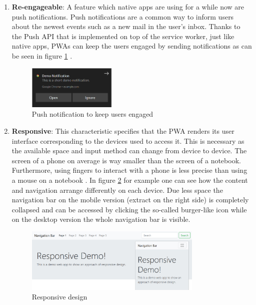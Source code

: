 \begin{enumerate}
	\item \textbf{Re-engageable}: A feature which native apps are using for a while now are push notifications. Push notifications are a common way to inform users about the newest events such as a new mail in the user’s inbox. Thanks to the Push API that is implemented on top of the service worker, just like native apps,  \acs{PWA}s can keep the users engaged by sending notifications as can be seen in figure \ref{fig:pwa_reengageable} \cite[p. 201]{hajianProgressiveWebApps2019}.

\begin{figure}[htbp] 
	\centering
	\includegraphics[width=0.4\textwidth]{Assets/chapter_pwa/demonotification.PNG}
	\caption{Push notification to keep users engaged}
	\label{fig:pwa_reengageable}
\end{figure}

	\item \textbf{Responsive}: This characteristic specifies that the  \acs{PWA} renders its user interface corresponding to the devices used to access it. This is necessary as the available space and input method can change from device to device. The screen of a phone on average is way smaller than the screen of a notebook. Furthermore, using fingers to interact with a phone is less precise than using a mouse on a notebook \cite[pp. 115-116]{liebelProgressiveWebApps2019}. In figure \ref{fig:pwa_responsive} for example one can see how the content and navigation arrange differently on each device. Due less space the navigation bar on the mobile version (extract on the right side) is completely collapsed and can be accessed by clicking the so-called burger-like icon while on the desktop version the whole navigation bar is visible.

\begin{figure}[htbp] 
	\centering
	\includegraphics[width=0.8\textwidth]{Assets/chapter_pwa/responsive-overall.jpg}
	\caption{Responsive design}
	\label{fig:pwa_responsive}
\end{figure}


\end{enumerate}
